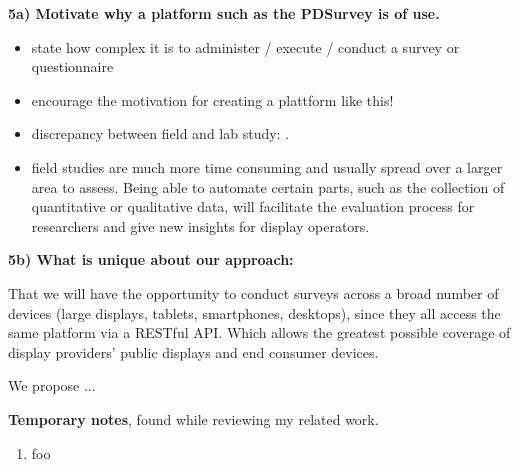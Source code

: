 

	\textbf{5a) Motivate why a platform such as the PDSurvey is of use. }

		\begin{itemize}[itemsep=0pt] 
		\item state how complex it is to administer / execute / conduct a survey or questionnaire
		\item encourage the motivation for creating a plattform like this!
		\item discrepancy between field and lab study: \cite{Ojala2011}.
		\item field studies are much more time consuming and usually spread over a larger area to assess. Being able to automate certain parts, such as the collection of quantitative or qualitative data, will facilitate the evaluation process for researchers and give new insights for display operators.
		\end{itemize}

	\textbf{5b) What is unique about our approach:}

		That we will have the opportunity to conduct surveys across a broad number of devices (large displays, tablets, smartphones, desktops), since they all access the same platform via a RESTful API. Which allows the greatest possible coverage of display providers' public displays and end consumer devices.

		We propose ...







	\textbf{Temporary notes}, found while reviewing my related work.


	\begin{enumerate}
	\item foo
	\end{enumerate}

